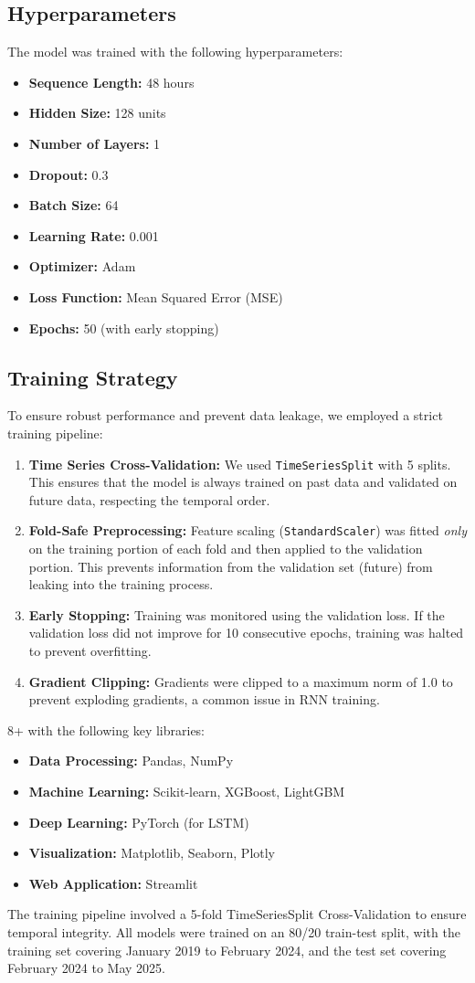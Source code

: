 \subsection{Hyperparameters}
The model was trained with the following hyperparameters:
\begin{itemize}
    \item \textbf{Sequence Length:} 48 hours
    \item \textbf{Hidden Size:} 128 units
    \item \textbf{Number of Layers:} 1
    \item \textbf{Dropout:} 0.3
    \item \textbf{Batch Size:} 64
    \item \textbf{Learning Rate:} 0.001
    \item \textbf{Optimizer:} Adam
    \item \textbf{Loss Function:} Mean Squared Error (MSE)
    \item \textbf{Epochs:} 50 (with early stopping)
\end{itemize}

\subsection{Training Strategy}
To ensure robust performance and prevent data leakage, we employed a strict training pipeline:

\begin{enumerate}
    \item \textbf{Time Series Cross-Validation:} We used \texttt{TimeSeriesSplit} with 5 splits. This ensures that the model is always trained on past data and validated on future data, respecting the temporal order.
    \item \textbf{Fold-Safe Preprocessing:} Feature scaling (\texttt{StandardScaler}) was fitted \textit{only} on the training portion of each fold and then applied to the validation portion. This prevents information from the validation set (future) from leaking into the training process.
    \item \textbf{Early Stopping:} Training was monitored using the validation loss. If the validation loss did not improve for 10 consecutive epochs, training was halted to prevent overfitting.
    \item \textbf{Gradient Clipping:} Gradients were clipped to a maximum norm of 1.0 to prevent exploding gradients, a common issue in RNN training.
\end{enumerate}
8+ with the following key libraries:
\begin{itemize}
    \item \textbf{Data Processing:} Pandas, NumPy
    \item \textbf{Machine Learning:} Scikit-learn, XGBoost, LightGBM
    \item \textbf{Deep Learning:} PyTorch (for LSTM)
    \item \textbf{Visualization:} Matplotlib, Seaborn, Plotly
    \item \textbf{Web Application:} Streamlit
\end{itemize}

The training pipeline involved a 5-fold TimeSeriesSplit Cross-Validation to ensure temporal integrity. All models were trained on an 80/20 train-test split, with the training set covering January 2019 to February 2024, and the test set covering February 2024 to May 2025.

